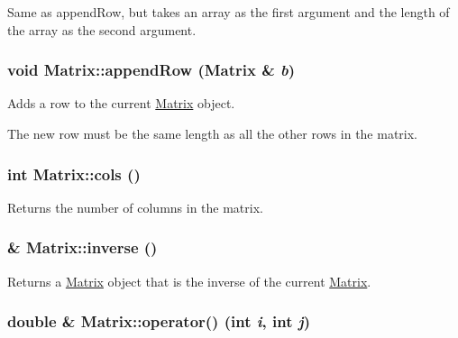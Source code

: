 Same as appendRow, but takes an array as the first argument and the length of the array as the second argument. 

\hypertarget{class_matrix_a20c175983a6b23a83fccfe8f726b3b07}{
\subsubsection[{appendRow}]{\setlength{\rightskip}{0pt plus 5cm}void Matrix::appendRow ({\bf Matrix} \& {\em b})}}
\label{class_matrix_a20c175983a6b23a83fccfe8f726b3b07}


Adds a row to the current \hyperlink{class_matrix}{Matrix} object. 

The new row must be the same length as all the other rows in the matrix. \hypertarget{class_matrix_a35649f43610688d020b2cad91f616d51}{
\subsubsection[{cols}]{\setlength{\rightskip}{0pt plus 5cm}int Matrix::cols ()}}
\label{class_matrix_a35649f43610688d020b2cad91f616d51}


Returns the number of columns in the matrix. 

\hypertarget{class_matrix_a474b9ebea883f90ee54d963f5af8d33e}{
\subsubsection[{inverse}]{ \& Matrix::inverse ()}}
\label{class_matrix_a474b9ebea883f90ee54d963f5af8d33e}


Returns a \hyperlink{class_matrix}{Matrix} object that is the inverse of the current \hyperlink{class_matrix}{Matrix}. 

\hypertarget{class_matrix_a83a1c6c6f2f7c88a72a7ee98cae90c24}{
\subsubsection[{operator()}]{\setlength{\rightskip}{0pt plus 5cm}double \& Matrix::operator() (int {\em i}, \/  int {\em j})}}
\label{class_matrix_a83a1c6c6f2f7c88a72a7ee98cae90c24}


